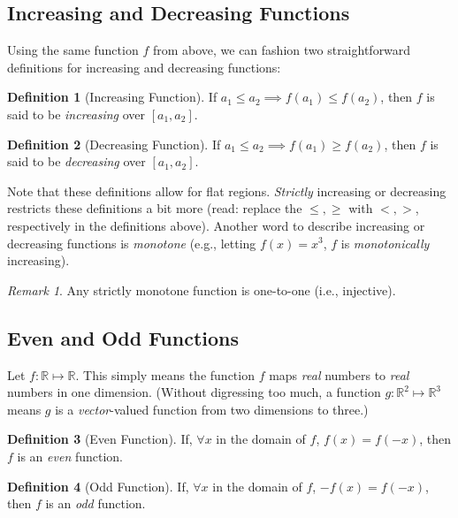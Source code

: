 \documentclass[12pt,english]{scrartcl}
\newcommand{\R}{\mathbb{R}}
\theoremstyle{definition}
\newtheorem{definition}{Definition}[section]
\theoremstyle{remark}
\newtheorem*{remark}{Remark}
\begin{document}
\subsection{Increasing and Decreasing Functions}%
\label{sub:increasing_and_decreasing_functions}

Using the same function $f$ from above, we can fashion two straightforward
definitions for increasing and decreasing functions:

\begin{definition}[Increasing Function] If $a_{1} \leq a_{2} \implies f(a_{1})
    \leq f(a_{2})$, then $f$ is said to be \textit{increasing} over $[a_{1},
    a_{2}]$.
\end{definition}

\begin{definition}[Decreasing Function] If $a_{1} \leq a_{2} \implies f(a_{1})
    \geq f(a_{2})$, then $f$ is said to be \textit{decreasing} over $[a_{1},
    a_{2}]$.
\end{definition}

Note that these definitions allow for flat regions. \textit{Strictly}
increasing or decreasing restricts these definitions a bit more (read: replace
the $\leq, \geq$ with $<, >$, respectively in the definitions above). Another
word to describe increasing or decreasing functions is \textit{monotone} (e.g.,
letting $f(x) = x^{3}$,  $f$ is \textit{monotonically} increasing).

\begin{remark}
    Any strictly monotone function is one-to-one (i.e., injective).
\end{remark}

\subsection{Even and Odd Functions}%
\label{sub:even_and_odd_functions}

Let $f \colon \R \mapsto \R$. This simply means the function $f$ maps
\textit{real} numbers to \textit{real} numbers in one dimension. (Without
digressing too much, a function $g \colon \R^{2} \mapsto \R^{3}$ means $g$ is a
\textit{vector}-valued function from two dimensions to three.)

\begin{definition}[Even Function] If, $\forall x$ in the domain of $f$, $f(x) =
    f(-x)$, then $f$ is an \textit{even} function.
\end{definition}

\begin{definition}[Odd Function] If, $\forall x$ in the domain of $f$, $-f(x) =
    f(-x)$, then $f$ is an \textit{odd} function.
\end{definition}
\end{document}
